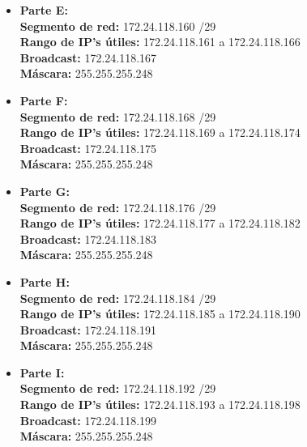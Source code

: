 \begin{itemize}[leftmargin=*]
    \item \textbf{Parte E:} \\
    \textbf{Segmento de red:} 172.24.118.160 /29 \\
    \textbf{Rango de IP's útiles:} 172.24.118.161 a 172.24.118.166 \\
    \textbf{Broadcast:} 172.24.118.167 \\
    \textbf{Máscara:} 255.255.255.248 
    \vspace{5pt}

    \item \textbf{Parte F:} \\
    \textbf{Segmento de red:} 172.24.118.168 /29 \\
    \textbf{Rango de IP's útiles:} 172.24.118.169 a 172.24.118.174 \\
    \textbf{Broadcast:} 172.24.118.175 \\
    \textbf{Máscara:} 255.255.255.248 
    \vspace{5pt}

    \item \textbf{Parte G:} \\
    \textbf{Segmento de red:} 172.24.118.176 /29 \\
    \textbf{Rango de IP's útiles:} 172.24.118.177 a 172.24.118.182 \\
    \textbf{Broadcast:} 172.24.118.183 \\
    \textbf{Máscara:} 255.255.255.248 
    \vspace{5pt}

    \item \textbf{Parte H:} \\
    \textbf{Segmento de red:} 172.24.118.184 /29 \\
    \textbf{Rango de IP's útiles:} 172.24.118.185 a 172.24.118.190 \\
    \textbf{Broadcast:} 172.24.118.191 \\
    \textbf{Máscara:} 255.255.255.248 
    \vspace{5pt}

    \item \textbf{Parte I:} \\
    \textbf{Segmento de red:} 172.24.118.192 /29 \\
    \textbf{Rango de IP's útiles:} 172.24.118.193 a 172.24.118.198 \\
    \textbf{Broadcast:} 172.24.118.199 \\
    \textbf{Máscara:} 255.255.255.248 
    \vspace{5pt}


\end{itemize}
